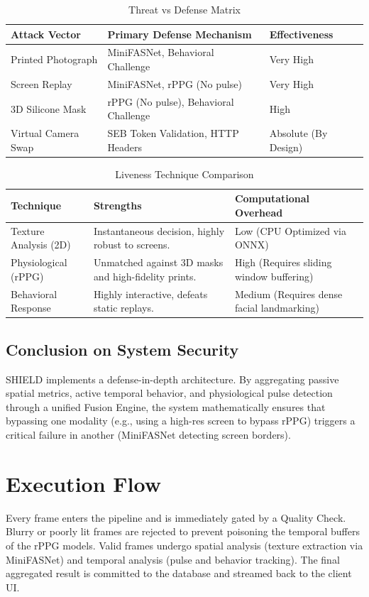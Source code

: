 \documentclass[12pt, a4paper]{report}
\begin{document}
\begin{table}[H]
\centering
\caption{Threat vs Defense Matrix}
\begin{tabularx}{\textwidth}{|l|l|X|}
\hline
\textbf{Attack Vector} & \textbf{Primary Defense Mechanism} & \textbf{Effectiveness} \\
\hline
Printed Photograph & MiniFASNet, Behavioral Challenge & Very High \\
Screen Replay & MiniFASNet, rPPG (No pulse) & Very High \\
3D Silicone Mask & rPPG (No pulse), Behavioral Challenge & High \\
Virtual Camera Swap & SEB Token Validation, HTTP Headers & Absolute (By Design) \\
\hline
\end{tabularx}
\end{table}

\begin{table}[H]
\centering
\caption{Liveness Technique Comparison}
\begin{tabularx}{\textwidth}{|X|X|X|}
\hline
\textbf{Technique} & \textbf{Strengths} & \textbf{Computational Overhead} \\
\hline
Texture Analysis (2D) & Instantaneous decision, highly robust to screens. & Low (CPU Optimized via ONNX) \\
Physiological (rPPG) & Unmatched against 3D masks and high-fidelity prints. & High (Requires sliding window buffering) \\
Behavioral Response & Highly interactive, defeats static replays. & Medium (Requires dense facial landmarking) \\
\hline
\end{tabularx}
\end{table}

\section{Conclusion on System Security}
SHIELD implements a defense-in-depth architecture. By aggregating passive spatial metrics, active temporal behavior, and physiological pulse detection through a unified Fusion Engine, the system mathematically ensures that bypassing one modality (e.g., using a high-res screen to bypass rPPG) triggers a critical failure in another (MiniFASNet detecting screen borders).
\iffalse
\chapter{Execution Flow}
Every frame enters the pipeline and is immediately gated by a Quality Check. Blurry or poorly lit frames are rejected to prevent poisoning the temporal buffers of the rPPG models. Valid frames undergo spatial analysis (texture extraction via MiniFASNet) and temporal analysis (pulse and behavior tracking). The final aggregated result is committed to the database and streamed back to the client UI.
\end{document}
